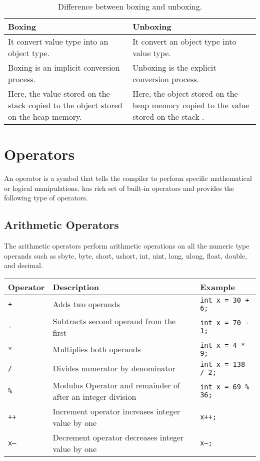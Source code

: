 	\begin{table}[h]
	\centering
	\caption{Difference between boxing and unboxing.}\label{tab:boxing-vs-unboxing}
	\begin{tabular}{p{5.5cm}p{5.5cm}}
  \toprule
		\textbf{Boxing} & \textbf{Unboxing} \\
		\midrule
		It convert value type into an object type.  & It convert an object type into value type. \\
		Boxing is an implicit conversion process. & Unboxing is the explicit conversion process.\\
		Here, the value stored on the stack copied to the object stored on the heap memory. & Here, the object stored on the heap memory copied to the value stored on the stack . \\
	\bottomrule
	\end{tabular}
\end{table}

\section{Operators}
An operator is a symbol that tells the compiler to perform specific mathematical or logical manipulations. {\cs} has rich set of built-in operators and provides the following type of operators.


\subsection{Arithmetic Operators}
The arithmetic operators perform arithmetic operations on all the numeric type operands such as sbyte, byte, short, ushort, int, uint, long, ulong, float, double, and decimal.

\begin{table}[htb!]
	\centering
	\begin{tabular}{p{0.8cm} p{6cm}p{3cm}}
		\toprule
		Operator     & Description                                                 & Example                    \\ \midrule
		\texttt{+}   & Adds two operands                                           & \texttt{int x = 30 + 6;}   \\
		\texttt{-}   & Subtracts second operand from the first                     & \texttt{int x = 70 - 1; }  \\
		\texttt{*}   & Multiplies both operands                                    & \texttt{int x = 4 * 9;}    \\
		\texttt{/}   & Divides numerator by denominator                            & \texttt{int x = 138 / 2;}  \\
		\texttt{\%}  & Modulus Operator and remainder of after an integer division & \texttt{int x = 69 \% 36;} \\
		\texttt{++}  & Increment operator increases integer value by one           & \texttt{x++;}              \\
		\texttt{x--} & Decrement operator decreases integer value by one           & \texttt{x--;}              \\ \bottomrule
	\end{tabular}
\end{table}

